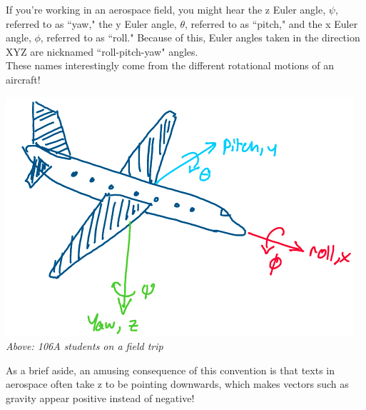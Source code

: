\documentclass[oneside]{book}
\begin{document}
If you're working in an aerospace field, you might hear the z Euler angle, $\psi$, referred to as ``yaw," the y Euler angle, $\theta$, referred to as ``pitch," and the x Euler angle, $\phi$, referred to as ``roll." Because of this, Euler angles taken in the direction XYZ are nicknamed ``roll-pitch-yaw" angles.\\
These names interestingly come from the different rotational motions of an aircraft!
\begin{center}
    \includegraphics[scale=0.4]{images/airplane.png}\\
    \textit{Above: 106A students on a field trip}
\end{center}
As a brief aside, an amusing consequence of this convention is that texts in aerospace often take z to be pointing downwards, which makes vectors such as gravity appear positive instead of negative!
\end{document}

